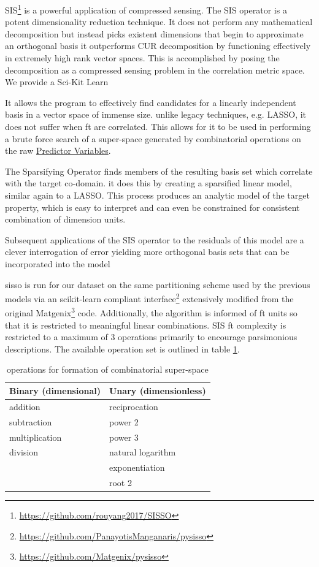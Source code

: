\documentclass[aip, jmp, amsmath, amssymb, nofootinbib]{revtex4-2}
\begin{document}
SIS\footnote{\url{https://github.com/rouyang2017/SISSO}} is a powerful application of compressed
sensing\cite{ghiringhelli-2017-learn-physic}. The SIS operator is a
potent dimensionality reduction technique. It does not perform any
mathematical decomposition but instead picks existent dimensions that
begin to approximate an orthogonal basis it outperforms
CUR\cite{ray-2021-various-dimen,hamm-2019-cur-decom} decomposition by
functioning effectively in extremely high rank vector spaces. This is
accomplished by posing the decomposition as a compressed sensing
problem in the correlation metric space. We provide a Sci-Kit Learn

It allows the program to effectively find candidates for a linearly
independent basis in a vector space of immense size. unlike legacy
techniques, e.g. LASSO, it does not suffer when \gls{ft} are
correlated\cite{tibshirani-1996-regres-shrin,gauraha-2018-introd-to-lasso}. This
allows for it to be used in performing a brute force search of a
super-space generated by combinatorial operations on the raw \hyperref[sec:orgc3205dc]{Predictor Variables}.

The Sparsifying Operator finds members of the resulting basis set
which correlate with the target co-domain. it does this by creating a
sparsified linear model, similar again to a LASSO. This process
produces an analytic model of the target property, which is easy to
interpret and can even be constrained for consistent combination of
dimension units.

Subsequent applications of the SIS operator to the residuals of this
model are a clever interrogation of error\cite{mayo-1998-error-growt}
yielding more orthogonal basis sets that can be incorporated into the
model

\acrshort{sisso} is run for our dataset on the same partitioning scheme used by
the previous models via an scikit-learn
compliant\cite{buitinck-2013-api} interface\footnote{\url{https://github.com/PanayotisManganaris/pysisso}} extensively modified
from the original Matgenix\footnote{\url{https://github.com/Matgenix/pysisso}} code. Additionally, the algorithm is
informed of \gls{ft} units so that it is restricted to meaningful
linear combinations. SIS \gls{ft} complexity is restricted to a
maximum of 3 operations primarily to encourage parsimonious
descriptions. The available operation set is outlined in table
\ref{tbl:ops}.

\begin{table}[htbp]
\caption{\label{tbl:ops} operations for formation of combinatorial super-space}
\centering
\begin{tabular}{ll}
Binary (dimensional) & Unary (dimensionless)\\
\hline
addition & reciprocation\\
subtraction & power 2\\
multiplication & power 3\\
division & natural logarithm\\
 & exponentiation\\
 & root 2\\
\end{tabular}
\end{table}
\end{document}
